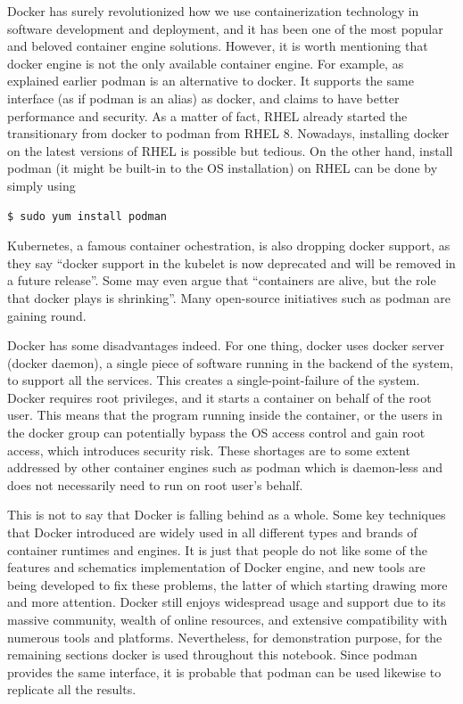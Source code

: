 Docker has surely revolutionized how we use containerization technology in software development and deployment, and it has been one of the most popular and beloved container engine solutions. However, it is worth mentioning that docker engine is not the only available container engine. For example, as explained earlier podman is an alternative to docker. It supports the same interface (as if podman is an alias) as docker, and claims to have better performance and security. As a matter of fact, RHEL already started the transitionary from docker to podman from RHEL 8. Nowadays, installing docker on the latest versions of RHEL is possible but tedious. On the other hand, install podman (it might be built-in to the OS installation) on RHEL can be done by simply using
\begin{lstlisting}
$ sudo yum install podman
\end{lstlisting}
Kubernetes, a famous container ochestration, is also dropping docker support, as they say ``docker support in the kubelet is now deprecated and will be removed in a future release''. Some may even argue that ``containers are alive, but the role that docker plays is shrinking''. Many open-source initiatives such as podman are gaining round.

Docker has some disadvantages indeed. For one thing, docker uses docker server (docker daemon), a single piece of software running in the backend of the system, to support all the services. This creates a single-point-failure of the system. Docker requires root privileges, and it starts a container on behalf of the root user. This means that the program running inside the container, or the users in the docker group can potentially bypass the OS access control and gain root access, which introduces security risk. These shortages are to some extent addressed by other container engines such as podman which is daemon-less and does not necessarily need to run on root user's behalf.

This is not to say that Docker is falling behind as a whole. Some key techniques that Docker introduced are widely used in all different types and brands of container runtimes and engines. It is just that people do not like some of the features and schematics implementation of Docker engine, and new tools are being developed to fix these problems, the latter of which starting drawing more and more attention. Docker still enjoys widespread usage and support due to its massive community, wealth of online resources, and extensive compatibility with numerous tools and platforms. Nevertheless, for demonstration purpose, for the remaining sections docker is used throughout this notebook. Since podman provides the same interface, it is probable that podman can be used likewise to replicate all the results.

